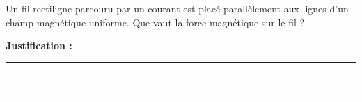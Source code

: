 Un fil rectiligne parcouru par un courant est placé parallèlement aux lignes d'un champ magnétique uniforme. Que vaut la force magnétique sur le fil ?

\choices

\noindent\textbf{Justification :} \hrulefill \\[2.5ex]
\rule{\linewidth}{0.4pt} \\[2.5ex]
\rule{\linewidth}{0.4pt}
\vfill
